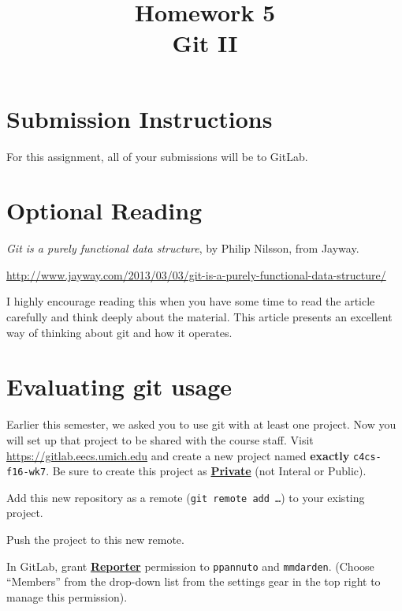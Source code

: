 \documentclass{article}
\begin{document}
\fancyhead[C]{}
\fancyhead[L]{}
\fancyhead[R]{}

\fancyfoot[C]{\color{gray} \thepage~/~\pageref*{LastPage}}
\pagestyle{fancyplain}


\title{\textbf{Homework 5\\Git II}}
\author{\textbf{\color{violet}{Solutions}}}
\date{}
\maketitle


\section*{Submission Instructions}
For this assignment, all of your submissions will be to GitLab.

\section*{Optional Reading}

\emph{Git is a purely functional data structure}, by Philip Nilsson, from Jayway.

\url{http://www.jayway.com/2013/03/03/git-is-a-purely-functional-data-structure/}

I highly encourage reading this when you have some time to read the article
carefully and think deeply about the material.
This article presents an excellent way of thinking about git and how it
operates.



\section{Evaluating git usage}

Earlier this semester, we asked you to use git with at least one project. Now
you will set up that project to be shared with the course staff. Visit
\url{https://gitlab.eecs.umich.edu} and create a new project named
\textbf{exactly} \texttt{c4cs-f16-wk7}.
Be sure to create this project as
\textbf{\ul{Private}} (not Interal or Public).

Add this new repository as a remote (\texttt{git remote add \dots}) to your
existing project.

Push the project to this new remote.

In GitLab, grant \textbf{\ul{Reporter}} permission to \texttt{ppannuto} and
\texttt{mmdarden}.
(Choose ``Members'' from the drop-down list from the settings gear in the top
right to manage this permission).
\end{document}
